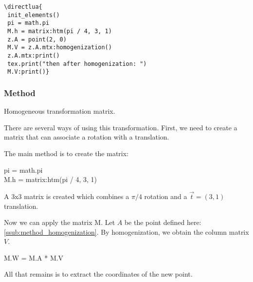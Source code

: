 \begin{minipage}{.5\textwidth}
\begin{verbatim}
\directlua{
 init_elements()
 pi = math.pi
 M.h = matrix:htm(pi / 4, 3, 1)
 z.A = point(2, 0)
 M.V = z.A.mtx:homogenization()
 z.A.mtx:print()
 tex.print("then after homogenization: ")
 M.V:print()}
\end{verbatim}
\end{minipage}
\begin{minipage}{.5\textwidth}
\end{minipage}


\subsubsection{Method } %
\label{ssub:method_htm}
Homogeneous transformation matrix.

There are several ways of using this transformation. First, we need to create a matrix that can associate a rotation with a translation.

The main method is to create the matrix:

\begin{mybox}
  pi  = math.pi\\
  M.h   = matrix:htm(pi / 4, 3, 1)
\end{mybox}

A 3x3 matrix is created which combines a $\pi/4$ rotation and a $\overrightarrow{t}=(3,1)$ translation.



Now we can apply the matrix M. Let $A$ be the point defined here: \ref{ssub:method_homogenization}. By homogenization, we obtain the column matrix $V$.


\begin{mybox}
M.W = M.A * M.V
\end{mybox}


All that remains is to extract the coordinates of the new point.

